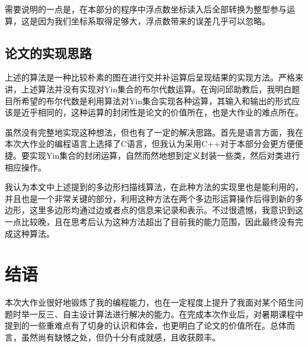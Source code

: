 \documentclass{article}
\begin{document}
	需要说明的一点是，在本部分的程序中浮点数坐标读入后全部转换为整型参与运算，这是因为我们坐标系取得足够大，浮点数带来的误差几乎可以忽略。

	\subsection{论文的实现思路}
	上述的算法是一种比较朴素的图在进行交并补运算后呈现结果的实现方法。严格来讲，上述算法并没有实现对Yin集合的布尔代数运算。在询问邱助教后，我明白题目所希望的布尔代数是利用算法对Yin集合实现各种运算，其输入和输出的形式应该是近乎相同的，这种运算的封闭性是论文的价值所在，也是大作业的难点所在。
	
	虽然没有完整地实现这种想法，但也有了一定的解决思路。首先是语言方面，我在本次大作业的编程语言上选择了C语言，但我认为采用C++对于本部分会更方便便捷。要实现Yin集合的封闭运算，自然而然地想到定义封装一些类，然后对类进行相应操作。
	
	我认为本文中上述提到的多边形扫描线算法，在此种方法的实现里也是能利用的，并且也是一个非常关键的部分，利用这种方法在两个多边形运算操作后得到新的多边形，这里多边形均通过边或者点的信息来记录和表示。不过很遗憾，我意识到这一点比较晚，且在思考后认为这种方法超出了目前我的能力范围，因此最终没有完成这种算法。

	\section{结语}
	本次大作业很好地锻炼了我的编程能力，也在一定程度上提升了我面对某个陌生问题时举一反三、自主设计算法进行解决的能力。在完成本次作业后，对暑期课程中提到的一些重难点有了切身的认识和体会，也更明白了论文的价值所在。总体而言，虽然尚有缺憾之处，但仍十分有成就感，且收获颇丰。
	
\end{document}
